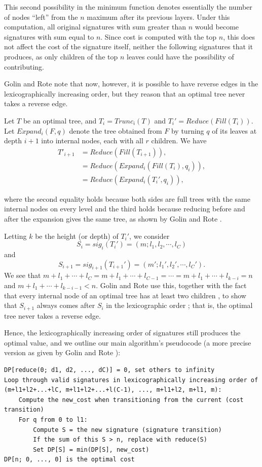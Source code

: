 \documentclass[a4paper,10pt,english]{scrartcl}
\begin{document}
This second possibility in the minimum function denotes essentially the number of nodes ``left'' from the $n$ maximum after its previous layers. Under this computation, all original signatures with sum greater than $n$ would become signatures with sum equal to $n$. Since cost is computed with the top $n$, this does not affect the cost of the signature itself, neither the following signatures that it produces, as only children of the top $n$ leaves could have the possibility of contributing.

Golin and Rote \cite{GolinRote1998} note that now, however, it is possible to have reverse edges in the lexicographically increasing order, but they reason that an optimal tree never takes a reverse edge. 

Let $T$ be an optimal tree, and $T_i = Trunc_i(T)$ and $T_i' = Reduce(Fill(T_i))$. Let $Expand_i(F,q)$ denote the tree obtained from $F$ by turning $q$ of its leaves at depth $i+1$ into internal nodes, each with all $r$ children. We have
\begin{align*}
    T'_{i+1} &= Reduce(Fill(T_{i+1})),\\
    &= Reduce(Expand_i(Fill(T_i), q_i)),\\
    &= Reduce(Expand_i(T_i', q_i)),
\end{align*}

where the second equality holds because both sides are full trees with the same internal nodes on every level and the third holds because reducing before and after the expansion gives the same tree, as shown by Golin and Rote \cite[Lemma~10]{GolinRote1998}.

Letting $k$ be the height (or depth) of $T_i'$, we consider $$S_i = sig_i(T_i') = (m; l_1, l_2, \cdots, l_C)$$ and $$S_{i+1} = sig_{i+1}(T_{i+1}') = (m'; l_1', l_2', \cdots, l_C').$$ We see that $m+l_1+\cdots + l_C = m+l_1+\cdots + l_{C-1} = \cdots = m+l_1+\cdots + l_{k-i} = n$ and $m+l_1+\cdots + l_{k-i-1} < n$. Golin and Rote use this, together with the fact that every internal node of an optimal tree has at least two children \cite[Lemma~2]{GolinRote1998}, to show that $S_{i+1}$ always comes after $S_i$ in the lexicographic order \cite[Lemma~10]{GolinRote1998}; that is, the optimal tree never takes a reverse edge. 

Hence, the lexicographically increasing order of signatures still produces the optimal value, and we outline our main algorithm's pseudocode (a more precise version as given by Golin and Rote \cite{GolinRote1998}):

\begin{verbatim}
DP[reduce(0; d1, d2, ..., dC)] = 0, set others to infinity
Loop through valid signatures in lexicographically increasing order of 
(m+l1+l2+...+lC, m+l1+l2+...+l(C-1), ..., m+l1+l2, m+l1, m):
    Compute the new_cost when transitioning from the current (cost transition)
    For q from 0 to l1:
        Compute S = the new signature (signature transition)
        If the sum of this S > n, replace with reduce(S)
        Set DP[S] = min(DP[S], new_cost)
DP[n; 0, ..., 0] is the optimal cost 
\end{verbatim}
\end{document}
